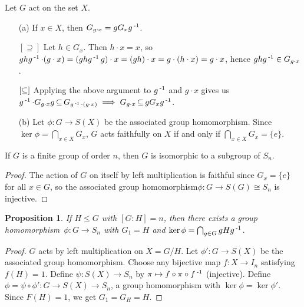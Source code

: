 \documentclass[11pt]{book}
\newcounter{counter}
\newtheorem{proposition}[counter]{Proposition}   \newtheorem{problem}[counter]{Problem}   \newtheorem*{proposition*}{Proposition}   \newtheorem*{lemma*}{Lemma}
\theoremstyle{definition}   \newtheorem{defn}[counter]{Definition} %
\newcommand{\hm}{homomorphism}   \newcommand{\hms}{homomorphisms}   \newcommand{\iso}{isomorphism}
\DeclareMathOperator{\ra}{\rightarrow}   \DeclareMathOperator{\Poly}{\mathbf{P}}   \DeclareMathOperator{\spn}{\textnormal{span}}   \DeclareMathOperator{\aut}{\textnormal{Aut}}
\newcommand{\vs}{\vspace{8pt}}
\numberwithin{counter}{chapter}
\begin{document}
\vs

\begin{remark}
Let $G$ act on the set $X$.
\begin{enumerate}
\item[(a)] If $x \in X$, then $G_{g\cdot x} = g G_x g\operatorname{^{-1}}$.

$[\supseteq]$ Let $h \in G_x$. Then $h \cdot x = x$, so $ghg\operatorname{^{-1}} \cdot (g\cdot x) = (ghg\operatorname{^{-1}} g) \cdot x = (gh) \cdot x = g\cdot (h\cdot x) = g\cdot x$, hence $ghg\operatorname{^{-1}} \in G_{g\cdot x}$.

$[\operatorname{\subseteq}]$ Applying the above argument to $g\operatorname{^{-1}}$ and $g \cdot x$ gives us $g\operatorname{^{-1}} \cdot G_{g\cdot x} g \operatorname{\subseteq} G_{g\operatorname{^{-1}} \cdot (g\cdot x)} \implies G_{g\cdot x} \operatorname{\subseteq} g G_x g\operatorname{^{-1}}$.

\item[(b)] Let $\phi : G \ra S(X)$ be the associated group \hm. Since $\ker \phi = \bigcap_{x\in X} G_x$, $G$ acts faithfully on $X$ if and only if $\bigcap_{x\in X} G_x = \{e\}$.
\end{enumerate}
\end{remark}

\vs

\begin{corollary}
If $G$ is a finite group of order $n$, then $G$ is isomorphic to a subgroup of $S_n$.
\end{corollary}

\begin{proof}
The action of $G$ on itself by left multiplication is faithful since $G_x = \{e\}$ for all $x \in G$, so the associated group \hm $\phi : G \ra S(G) \cong S_n$ is injective.
\end{proof}

\vs

\begin{proposition}
If $H \leq G$ with $[G : H] = n$, then there exists a group \hm\ $\phi : G \ra S_n$ with $G_1 = H$ and $\ker \phi = \bigcap_{g\in G} gHg\operatorname{^{-1}}$.
\end{proposition}

\begin{proof}
$G$ acts by left multiplication on $X = G/H$. Let $\phi' : G \ra S(X)$ be the associated group \hm. Choose any bijective map $f : X \ra I_n$ satisfying $f(H) = 1$. Define $\psi : S(X) \ra S_n$ by $\pi \mapsto f \circ \pi \circ f\operatorname{^{-1}}$ (injective). Define $\phi = \psi \circ \phi' : G \ra S(X) \ra S_n$, a group homomorphism with $\ker \phi = \ker \phi'$. Since $F(H) = 1$, we get $G_1 = G_H = H$.
\end{proof}
\end{document}
